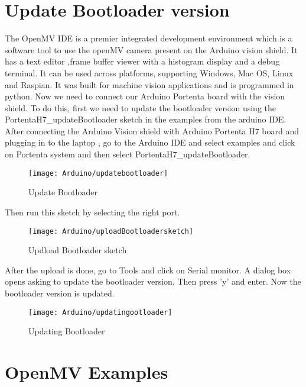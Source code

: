 \section{Update Bootloader version}
The OpenMV IDE is a premier integrated development environment which is a software tool  to use the openMV camera present on the Arduino vision shield.  It has a text editor ,frame buffer viewer with a histogram display and a debug terminal. It can be used across platforms, supporting Windows, Mac OS, Linux and Raspian. It was built for machine vision applications and is programmed in python\cite{OpenMV:2021}.
Now we need to connect our Arduino Portenta board with the vision shield. To do this, first we need to update the bootloader version using the PortentaH7\_updateBootloader sketch in the examples from the arduino IDE\cite{Romero:2020a}. After connecting the Arduino Vision shield with Arduino Portenta H7 board and plugging in to the laptop , go to the Arduino IDE and select examples and click on Portenta system and then select PortentaH7\_updateBootloader.
\begin{figure}[H]
	\centering
	\texttt{[image: Arduino/updatebootloader]}
	\caption{Update Bootloader}
	\label{figure 6.1}
\end{figure}
Then run this sketch by selecting the right port.
\begin{figure}[H]
	\centering
	\texttt{[image: Arduino/uploadBootloadersketch]}
	\caption{Updload Bootloader sketch}
	\label{figure 6.2}
\end{figure}
After the upload is done, go to Tools and click on Serial monitor. A dialog box opens asking to update the bootloader version. Then press 'y' and enter. Now the bootloader version is updated.
\begin{figure}[H]
	\centering
	\texttt{[image: Arduino/updatingootloader]}
	\caption{Updating Bootloader}
	\label{figure 6.3}
\end{figure}

\section{OpenMV Examples}

